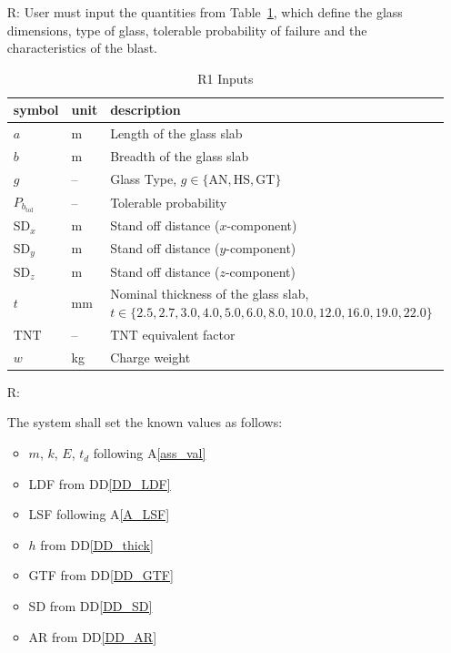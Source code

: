 \documentclass[12pt]{article}
\newcommand{\ddref}[1]{DD\ref{#1}}
\newcommand{\aref}[1]{A\ref{#1}}
\newcounter{reqnum} %
\begin{document}
\noindent \begin{itemize}

\item[R\refstepcounter{reqnum}\thereqnum \label{Input}:] User must input the quantities
  from Table~\ref{TblReqInput}, which define the glass dimensions, type of glass, tolerable probability of
  failure and the characteristics of the blast.

\renewcommand{\arraystretch}{1.2}

\begin{table}[!h]
\caption{R1 Inputs} 
\label{TblReqInput}
\renewcommand{\arraystretch}{1.2}
\begin{tabular}{l l p{11cm}} 
\toprule
\textbf{symbol} & \textbf{unit} & \textbf{description}\\
\midrule 
$a$ & \si{\metre}	& Length of the glass slab\\
$b$ & \si{\metre}	& Breadth of the glass slab\\
$g$ & -- & Glass Type, $g \in \{ \text{AN}, \text{HS}, \text{GT} \}$\\
$P_{b_{\text{tol}}}$ & -- & Tolerable probability\\
$\text{SD}_x$ & \si{\meter} & Stand off distance ($x$-component)\\
$\text{SD}_y$ & \si{\metre} & Stand off distance ($y$-component)\\
$\text{SD}_z$ & \si{\metre} & Stand off distance ($z$-component)\\
$t$ & \si{\milli\metre}	& Nominal thickness of the glass slab,\newline $t \in
                                  \{2.5, 2.7, 3.0, 4.0, 5.0, 6.0, 8.0, 10.0,
                                  12.0, 16.0, 19.0, 22.0\}$ \\
$\text{TNT}$ & -- & TNT equivalent factor\\
$w$ & \si{\kilo\gram}	& Charge weight\\
\bottomrule
\end{tabular}
\end{table}

\item [R\refstepcounter{reqnum}\thereqnum \label{KnownValues}:]

The system shall set the known values as follows:
\begin{itemize}
\item $m$, $k$, $E$, $t_d$ following \aref{ass_val}
\item LDF from \ddref{DD_LDF}
\item LSF following \aref{A_LSF}
\item $h$ from \ddref{DD_thick}
\item GTF from \ddref{DD_GTF}
\item SD from \ddref{DD_SD}
\item AR from \ddref{DD_AR}
\end{itemize}


\end{itemize}
\end{document}
